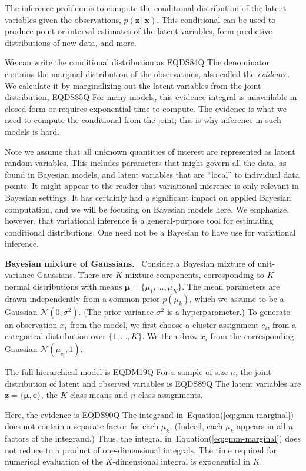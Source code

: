 \documentclass{article}
\DeclareRobustCommand{\parhead}[1]{\textbf{#1}~}
\DeclareRobustCommand{\mb}[1]{\ensuremath{\boldsymbol{\mathbf{#1}}}}
\begin{document}
The inference problem is to compute the conditional distribution of
the latent variables given the observations, $p({\mathbf{z}} {\,\vert\,} {\mathbf{x}})$. This
conditional can be used to produce point or interval estimates of the
latent variables, form predictive distributions of new data, and more.

We can write the conditional distribution as
EQDS84Q
The denominator contains the marginal distribution of the observations, also
called the \emph{evidence}. We calculate it by marginalizing out the
latent variables from the joint distribution,
EQDS85Q
For many models, this evidence integral is unavailable in closed form
or requires exponential time to compute. The evidence is what we need
to compute the conditional from the joint; this is why inference in
such models is hard.

Note we assume that all unknown quantities of interest are represented
as latent random variables.  This includes parameters that
might govern all the data, as found in Bayesian models, and latent
variables that are ``local'' to individual data points.  It might
appear to the reader that variational inference is only relevant in
Bayesian settings. It has certainly had a significant impact on
applied Bayesian computation, and we will be focusing on Bayesian
models here. We emphasize, however, that variational inference is a
general-purpose tool for estimating conditional distributions. One
need not be a Bayesian to have use for variational inference.

\parhead{Bayesian mixture of Gaussians.} Consider a Bayesian mixture
of unit-variance Gaussians. There are $K$ mixture components,
corresponding to $K$ normal distributions with means
${\mb{\mu}} = \{\mu_1, \ldots, \mu_K\}$. The mean parameters are drawn
independently from a common prior $p(\mu_k)$, which we assume to be a
Gaussian ${\mathcal{N}}(0, \sigma^2)$.  (The prior variance $\sigma^2$ is a
hyperparameter.)  To generate an observation $x_i$ from the model, we
first choose a cluster assignment $c_i$, from a categorical
distribution over $\{1, \dots, K\}$. We then draw $x_i$ from the
corresponding Gaussian ${\mathcal{N}} (\mu_{c_i}, 1)$.

The full hierarchical model is
EQDM19Q
For a sample of size $n$, the joint distribution of latent and
observed variables is
EQDS89Q
The latent variables are ${\mathbf{z}} = \{{\mb{\mu}}, {\mathbf{c}}\}$, the $K$ class means
and $n$ class assignments.

Here, the evidence is
EQDS90Q
The integrand in~Equation\nobreakspace \textup {(\ref {eq:gmm-marginal})} does not contain a separate
factor for each $\mu_k$. (Indeed, each $\mu_k$ appears in all $n$
factors of the integrand.) Thus, the integral
in~Equation\nobreakspace \textup {(\ref {eq:gmm-marginal})} does not reduce to a product of
one-dimensional integrals. The time required for numerical evaluation
of the $K$-dimensional integral is exponential in $K$.
\end{document}
